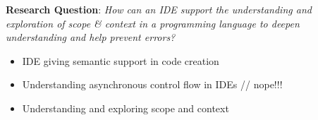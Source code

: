 \textbf{Research Question}: \emph{How can an IDE support the
understanding and exploration of scope \& context in a programming
language to deepen understanding and help prevent errors?}

\begin{itemize}
\itemsep1pt\parskip0pt
\item
  IDE giving semantic support in code creation
\item
  Understanding asynchronous control flow in IDEs // nope!!!
\item
  Understanding and exploring scope and context
\end{itemize}
